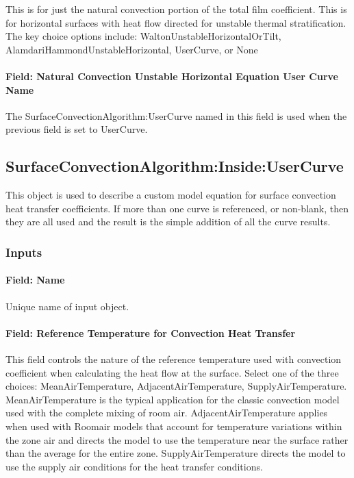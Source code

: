 This is for just the natural convection portion of the total film coefficient. This is for horizontal surfaces with heat flow directed for unstable thermal stratification. The key choice options include: WaltonUnstableHorizontalOrTilt, AlamdariHammondUnstableHorizontal, UserCurve, or None

\paragraph{Field: Natural Convection Unstable Horizontal Equation User Curve Name}\label{field-natural-convection-unstable-horizontal-equation-user-curve-name}

The SurfaceConvectionAlgorithm:UserCurve named in this field is used when the previous field is set to UserCurve.

\subsection{SurfaceConvectionAlgorithm:Inside:UserCurve}\label{surfaceconvectionalgorithminsideusercurve}

This object is used to describe a custom model equation for surface convection heat transfer coefficients. If more than one curve is referenced, or non-blank, then they are all used and the result is the simple addition of all the curve results.

\subsubsection{Inputs}\label{inputs-8}

\paragraph{Field: Name}\label{field-name-7}

Unique name of input object.

\paragraph{Field: Reference Temperature for Convection Heat Transfer}\label{field-reference-temperature-for-convection-heat-transfer}

This field controls the nature of the reference temperature used with convection coefficient when calculating the heat flow at the surface. Select one of the three choices: MeanAirTemperature, AdjacentAirTemperature, SupplyAirTemperature. MeanAirTemperature is the typical application for the classic convection model used with the complete mixing of room air. AdjacentAirTemperature applies when used with Roomair models that account for temperature variations within the zone air and directs the model to use the temperature near the surface rather than the average for the entire zone. SupplyAirTemperature directs the model to use the supply air conditions for the heat transfer conditions.

